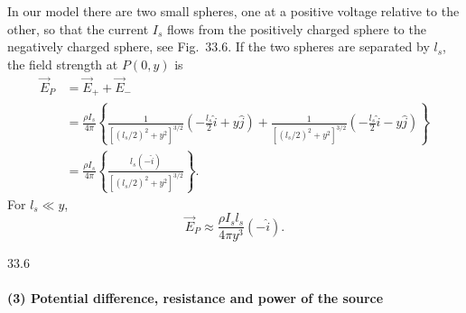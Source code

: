 In our model there are two small spheres, one at a positive voltage relative to the other, so that the current $I_s$ flows from the positively charged sphere to the negatively charged sphere, see Fig.~33.6. If the two spheres are separated by $l_s$, the field strength at $P(0,y)$ is
\begin{align*}
\vec{E}_P&=\vec{E}_++\vec{E}_-\\
&=\frac{\rho I_s}{4\pi}\left\{\frac{1}{\left[(l_s/2)^2+y^2\right]^{3/2}}\left(-\frac{l_s}{2}\hat{i}+y\hat{j}\right)
+\frac{1}{\left[(l_s/2)^2+y^2\right]^{3/2}}\left(-\frac{l_s}{2}\hat{i}-y\hat{j}\right)\right\}\\
&=\frac{\rho I_s}{4\pi}\left\{\frac{l_s(-\hat{i})}{\left[(l_s/2)^2+y^2\right]^{3/2}}\right\}.
\end{align*}
For $l_s\ll y$,
\[
\vec{E}_P\approx\frac{\rho I_s l_s}{4\pi y^3}(-\hat{i}).
\]

\begin{figbox}{33.6}
\end{figbox}

\paragraph{(3) Potential difference, resistance and power of the source}

